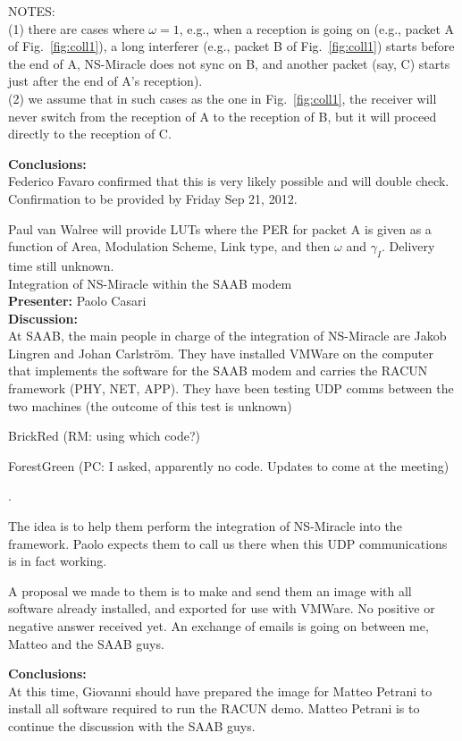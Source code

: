 \documentclass[11pt,journal,draftclsnofoot,onecolumn,twoside,letterpaper]{IEEEtran}
\newcommand{\RM}[1]{\begin{color}{BrickRed} (RM: #1) \end{color}}
\newcommand{\PC}[1]{\begin{color}{ForestGreen} (PC: #1) \end{color}}
\theoremstyle{definition} \newtheorem{definition}[]{Definition}
\theoremstyle{theorem} \newtheorem{theorem}[]{Theorem}
\begin{document}
NOTES:\\
(1) there are cases where $\omega = 1$, e.g., when a reception is going on (e.g., packet A of Fig.~\ref{fig:coll1}), a long interferer (e.g., packet B of Fig.~\ref{fig:coll1}) starts before the end of A, NS-Miracle does not sync on B, and another packet (say, C) starts just after the end of A's reception).\\
(2) we assume that in such cases as the one in Fig.~\ref{fig:coll1}, the receiver will never switch from the reception of A to the reception of B, but it will proceed directly to the reception of C.


{\bf Conclusions:}\\
Federico Favaro confirmed that this is very likely possible and will double check. Confirmation to be provided by Friday Sep 21, 2012.

Paul van Walree will provide LUTs where the PER for packet A is given as a function of Area, Modulation Scheme, Link type, and then $\omega$ and $\gamma_I$. Delivery time still unknown.
\  \\



 Integration of NS-Miracle within the SAAB modem\\
{\bf Presenter:} Paolo Casari\\
{\bf Discussion:} \\

At SAAB, the main people in charge of the integration of NS-Miracle are Jakob Lingren and Johan Carlstr\"{o}m. They have installed VMWare on the computer that implements the software for the SAAB modem and carries the RACUN framework (PHY, NET, APP). They have been testing UDP comms between the two machines (the outcome of this test is unknown) \RM{using which code?} \PC{I asked, apparently no code. Updates to come at the meeting}.

The idea is to help them perform the integration of NS-Miracle into the framework. Paolo expects them to call us there when this UDP communications is in fact working.

A proposal we made to them is to make and send them an image with all software already installed, and exported for use with VMWare. No positive or negative answer received yet. An exchange of emails is going on between me, Matteo and the SAAB guys.

{\bf Conclusions:}\\
At this time, Giovanni should have prepared the image for Matteo Petrani to install all software required to run the RACUN demo. Matteo Petrani is to continue the discussion with the SAAB guys.
\  \\
\end{document}
